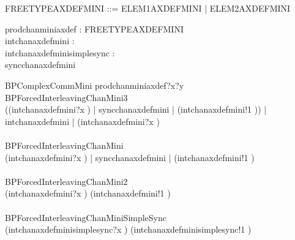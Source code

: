 \begin{zed}
   FREETYPEAXDEFMINI ::= ELEM1AXDEFMINI | ELEM2AXDEFMINI
\end{zed}

\begin{circus}
  \circchannel prodchanminiaxdef : \nat \cross FREETYPEAXDEFMINI \\
  \circchannel intchanaxdefmini : \nat \\
  \circchannel intchanaxdefminisimplesync : \nat \\
  \circchannel syncchanaxdefmini \\
\end{circus}

\begin{circus}
 \circprocess BPComplexCommMini \circdef \circbegin
    \circspot prodchanminiaxdef?x?y \then \Skip
 \circend \\

 \circprocess BPForcedInterleavingChanMini3 \circdef \circbegin \\
    \circspot 
      ((intchanaxdefmini?x \then \Skip) \lpar | \lchanset syncchanaxdefmini \rchanset | \rpar (intchanaxdefmini!1 \then \Skip))
      \lpar | \lchanset intchanaxdefmini \rchanset | \rpar (intchanaxdefmini?x \then \Skip)
    \\
 \circend \\

 \circprocess BPForcedInterleavingChanMini \circdef \circbegin \\
    \circspot (intchanaxdefmini?x \then \Skip) \lpar | \lchanset syncchanaxdefmini \rchanset | \rpar (intchanaxdefmini!1 \then \Skip) \\
 \circend \\

 \circprocess BPForcedInterleavingChanMini2 \circdef \circbegin \\
    \circspot (intchanaxdefmini?x \then \Skip) \interleave (intchanaxdefmini!1 \then \Skip) \\
 \circend \\

 \circprocess BPForcedInterleavingChanMiniSimpleSync \circdef \circbegin \\
    \circspot (intchanaxdefminisimplesync?x \then \Skip) \interleave (intchanaxdefminisimplesync!1 \then \Skip) \\
 \circend \\

 \end{circus}



